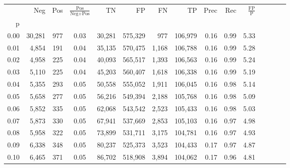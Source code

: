 \begin{tabular}{rrrcrrrrrrrrrrr}
\toprule
{} &     Neg &    Pos & $\frac{\text{Pos}}{\text{Neg}+\text{Pos}}$ &       TN &       FP &       FN &       TP &  Prec &   Rec & $\frac{\text{FP}}{\text{P}}$ \\
p    &         &        &                                            &          &          &          &          &       &       &                              \\
\midrule
0.00 &  30,281 &    977 &                                       0.03 &   30,281 &  575,329 &      977 &  106,979 &  0.16 &  0.99 &                         5.33 \\
0.01 &   4,854 &    191 &                                       0.04 &   35,135 &  570,475 &    1,168 &  106,788 &  0.16 &  0.99 &                         5.28 \\
0.02 &   4,958 &    225 &                                       0.04 &   40,093 &  565,517 &    1,393 &  106,563 &  0.16 &  0.99 &                         5.24 \\
0.03 &   5,110 &    225 &                                       0.04 &   45,203 &  560,407 &    1,618 &  106,338 &  0.16 &  0.99 &                         5.19 \\
0.04 &   5,355 &    293 &                                       0.05 &   50,558 &  555,052 &    1,911 &  106,045 &  0.16 &  0.98 &                         5.14 \\
0.05 &   5,658 &    277 &                                       0.05 &   56,216 &  549,394 &    2,188 &  105,768 &  0.16 &  0.98 &                         5.09 \\
0.06 &   5,852 &    335 &                                       0.05 &   62,068 &  543,542 &    2,523 &  105,433 &  0.16 &  0.98 &                         5.03 \\
0.07 &   5,873 &    330 &                                       0.05 &   67,941 &  537,669 &    2,853 &  105,103 &  0.16 &  0.97 &                         4.98 \\
0.08 &   5,958 &    322 &                                       0.05 &   73,899 &  531,711 &    3,175 &  104,781 &  0.16 &  0.97 &                         4.93 \\
0.09 &   6,338 &    348 &                                       0.05 &   80,237 &  525,373 &    3,523 &  104,433 &  0.17 &  0.97 &                         4.87 \\
0.10 &   6,465 &    371 &                                       0.05 &   86,702 &  518,908 &    3,894 &  104,062 &  0.17 &  0.96 &                         4.81 \\

\end{tabular}

